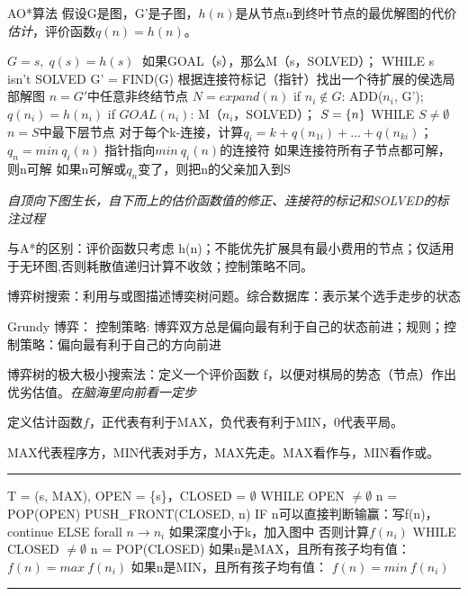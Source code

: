 \documentclass[twocolumn,zihao=5,linespread=1,heading=false,autoindent=0pt]{ctexart}
\DeclarePairedDelimiter{\set}{\{}{\}}
\newcommand{\HRule}[1][\medskipamount]{\par
  \vspace*{\dimexpr-\parskip-\baselineskip+#1}
  \noindent\rule{\linewidth}{0.2mm}\par
  \vspace*{\dimexpr-\parskip-.5\baselineskip+#1}}
\theoremstyle{exampstyle} \newtheorem{definition}{定义}[section]
\theoremstyle{exampstyle} \newtheorem{example}{例}[section]
\theoremstyle{exampstyle} \newtheorem{theorem}{定理}[section]
\theoremstyle{exampstyle} \newtheorem{lemma}{引理}[section]
\theoremstyle{exampstyle} \newtheorem{myproof}{证明}[section]
\begin{document}
AO*算法 假设G是图，G'是子图，$h(n)$是从节点n到终叶节点的最优解图的代价\emph{估计}，评价函数$q(n) = h(n)$。
\begin{multicols}{2}
    \begin{outline}[citemize]
        \1 $G = s,\; q(s) = h(s)\;$ 如果GOAL（s），那么M（s，SOLVED）；
        \1 WHILE s isn't SOLVED
            \2 G' = FIND(G) 根据连接符标记（指针）找出一个待扩展的侯选局部解图
            \2 $n = G'$中任意非终结节点
            \2 $N = expand(n)$
                \3 if $n_i \notin G$: ADD($n_i$, G'); $q(n_i) = h(n_i)$
                \3 if $GOAL(n_i)$: M（$n_i$，SOLVED）；
            \2 $S = \set{n}$
            \2 WHILE $S \neq \emptyset$
                \3 $n = S$中最下层节点
                \3 对于每个k-连接，计算$q_i = k + q(n_{1i}) + \dots + q(n_{ki})$； $q_n = min\ q_i(n)$
                \3 指针指向$min\ q_i(n)$的连接符
                \3 如果连接符所有子节点都可解，则n可解
                \3 如果n可解或$q_n$变了，则把n的父亲加入到S
    \end{outline}
\end{multicols}

\emph{自顶向下图生长，自下而上的估价函数值的修正、连接符的标记和SOLVED的标注过程}

与A*的区别：评价函数只考虑 h(n)；不能优先扩展具有最小费用的节点；仅适用于无环图,否则耗散值递归计算不收敛；控制策略不同。

博弈树搜索：利用与或图描述博奕树问题。综合数据库：表示某个选手走步的状态

Grundy 博弈： 控制策略: 博弈双方总是偏向最有利于自己的状态前进；规则；控制策略：偏向最有利于自己的方向前进

博弈树的极大极小搜索法：定义一个评价函数 f，以便对棋局的势态（节点）作出优劣估值。\emph{在脑海里向前看一定步}

定义估计函数$f$，正代表有利于MAX，负代表有利于MIN，0代表平局。

MAX代表程序方，MIN代表对手方，MAX先走。MAX看作与，MIN看作或。

\HRule

\begin{multicols}{2}
    
\begin{outline}[citemize]
    \1 T = (s, MAX), OPEN = \{s\}，CLOSED = $\emptyset$
    \1 WHILE OPEN $\neq \emptyset$
        \2 n = POP(OPEN)
        \2 PUSH\_FRONT(CLOSED, n)
        \2 IF n可以直接判断输赢：写f(n)，continue
        \2 ELSE forall $n \to n_i$
            \3 如果深度小于k，加入图中
            \3 否则计算$f(n_i)$
    \1 WHILE CLOSED $\ne \emptyset$
        \2 n = POP(CLOSED)
        \2 如果n是MAX，且所有孩子均有值：
            \3 $f(n) = max\ f(n_i)$
        \2 如果n是MIN，且所有孩子均有值：
            \3 $f(n) = min\ f(n_i)$
\end{outline}
\end{multicols}
\HRule
\end{document}
